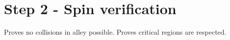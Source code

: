 \section*{Step 2 - Spin verification}

Proves no collisions in alley possible.
Proves critical regions are respected.